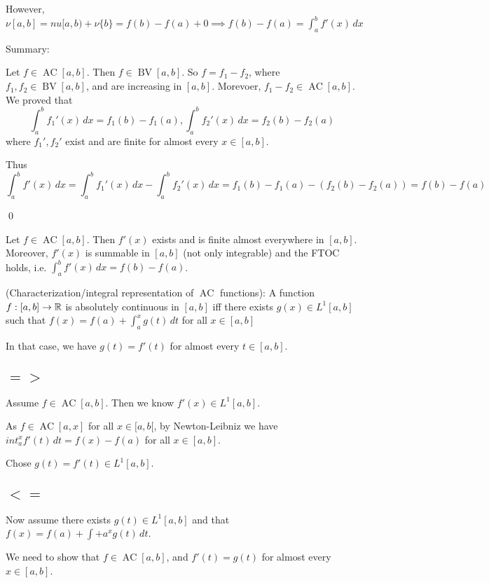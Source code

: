 \documentclass[x11names,reqno,14pt]{extarticle}
\DeclareMathOperator{\BV}{BV}
\DeclareMathOperator{\AC}{AC}
\begin{document}
However, $\nu[a,b] = nu[a,b) + \nu\{b\} = f(b) - f(a) + 0 \implies f(b) - f(a) = \int_a^bf'(x)\,dx$

Summary:

Let $f \in \AC[a,b]$. Then $f \in \BV[a,b]$. So $f = f_1 - f_2$, where $f_1, f_2 \in \BV[a,b]$, and are increasing in $[a,b]$. Morevoer, $f_1 - f_2 \in \AC[a,b]$. We proved that
\[
\int_a^bf_1'(x)\,dx = f_1(b) - f_1(a), \int_a^b f_2'(x)\,dx = f_2(b) - f_2(a)
\]
where $f_1', f_2'$ exist and are finite for almost every $x\in[a,b]$. 

Thus 
\[
\int_a^bf'(x)\,dx = \int_a^bf_1'(x)\,dx - \int_a^bf_2'(x)\,dx = f_1(b) - f_1(a) - (f_2(b) - f_2(a)) = f(b) - f(a)
\]

\qed

\thm

Let $f \in \AC[a,b]$. Then $f'(x)$ exists and is finite almost everywhere in $[a, b]$. Moreover, $f'(x)$ is summable in $[a, b]$ (not only integrable) and the FTOC holds, i.e. $\int_a^bf'(x)\,dx = f(b) - f(a)$.

\thm (Characterization/integral representation of $\AC$ functions): A function $f:[a,b]\to\mathbb{R}$ is absolutely continuous in $[a,b]$ iff there exists $g(x) \in L^1[a,b]$ such that $f(x) = f(a) + \int_a^xg(t)\,dt$ for all $x \in [a, b]$

\rem

In that case, we have $g(t) = f'(t)$ for almost every $t \in [a,b]$.

\proof

\subsection*{$=>$}

Assume $f \in \AC[a,b]$. Then we know $f'(x)\in L^1[a,b]. $

As $f \in \AC[a,x]$ for all $x\in[a,b[$, by  Newton-Leibniz we have $int_a^xf'(t)\,dt = f(x) - f(a)$ for all $x \in [a, b]$. 

Chose $g(t) = f'(t) \in L^1[a, b]$. 

\subsection*{$<=$}

Now assume there exists $g(t) \in L^1[a,b]$ and that $f(x) = f(a) + \int+a^xg(t)\,dt$. 

We need to show that $f \in \AC[a,b]$, and $f'(t) = g(t)$ for almost every $x \in [a, b]$.
\end{document}
